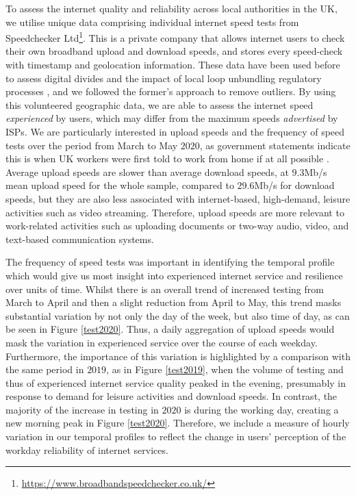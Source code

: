 \documentclass[Royal,times,sageh]{sagej}
\begin{document}
To assess the internet quality and reliability across local authorities
in the UK, we utilise unique data comprising individual internet speed
tests from Speedchecker Ltd\footnote{\url{https://www.broadbandspeedchecker.co.uk/}}.
This is a private company that allows internet users to check their own
broadband upload and download speeds, and stores every speed-check with
timestamp and geolocation information. These data have been used before
to assess digital divides \citep{riddlesden2014broadband} and the impact
of local loop unbundling regulatory processes
\citep{nardotto2015unbundling}, and we followed the former's approach to
remove outliers. By using this volunteered geographic data, we are able
to assess the internet speed \emph{experienced} by users, which may
differ from the maximum speeds \emph{advertised} by ISPs. We are
particularly interested in upload speeds and the frequency of speed
tests over the period from March to May \(2020\), as government
statements indicate this is when UK workers were first told to work from
home if at all possible \citep{GovUK2020}. Average upload speeds are
slower than average download speeds, at \(9.3\)Mb/s mean upload speed
for the whole sample, compared to \(29.6\)Mb/s for download speeds, but
they are also less associated with internet-based, high-demand, leisure
activities such as video streaming. Therefore, upload speeds are more
relevant to work-related activities such as uploading documents or
two-way audio, video, and text-based communication systems.

The frequency of speed tests was important in identifying the temporal
profile which would give us most insight into experienced internet
service and resilience over units of time. Whilst there is an overall
trend of increased testing from March to April and then a slight
reduction from April to May, this trend masks substantial variation by
not only the day of the week, but also time of day, as can be seen in
Figure \ref{test2020}. Thus, a daily aggregation of upload speeds would
mask the variation in experienced service over the course of each
weekday. Furthermore, the importance of this variation is highlighted by
a comparison with the same period in \(2019\), as in Figure
\ref{test2019}, when the volume of testing and thus of experienced
internet service quality peaked in the evening, presumably in response
to demand for leisure activities and download speeds. In contrast, the
majority of the increase in testing in \(2020\) is during the working
day, creating a new morning peak in Figure \ref{test2020}. Therefore, we
include a measure of hourly variation in our temporal profiles to
reflect the change in users' perception of the workday reliability of
internet services.
\end{document}
